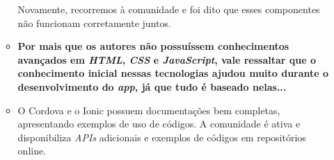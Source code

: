 \begin{itemize}
\begin{itemize}
		Novamente, recorremos à comunidade e foi dito que esses componentes não funcionam corretamente juntos.
		\item \textbf{Por mais que os autores não possuíssem conhecimentos avançados em \textit{HTML}, \textit{CSS} e \textit{JavaScript}, vale ressaltar que o conhecimento inicial nessas tecnologias ajudou muito 
		durante o desenvolvimento do \textit{app}, já que tudo é baseado nelas...}
		\item O Cordova e o Ionic possuem documentações bem completas, apresentando exemplos de uso de códigos. A comunidade é ativa e disponibiliza \textit{APIs} adicionais e exemplos de códigos em repositórios online.
	\end{itemize}
 	







 \end{itemize} 